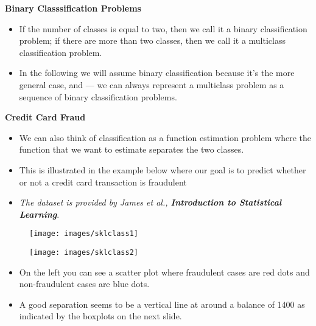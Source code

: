 \documentclass[SKL-MASTER.tex]{subfiles}
\begin{document}
\newpage
 	\LARGE
 	\textbf{Binary Classsification Problems}\\
 	\begin{itemize}
\item If the number of classes is equal to two, then we call it a binary classification problem; if there are more than two classes, then we call it a multiclass classification problem.
\item  In the following we will assume binary classification because it’s the more general case, and — we can always represent a multiclass problem as a sequence of binary classification problems.
\end{itemize}

\newpage
\textbf{Credit Card Fraud}
\begin{itemize}
\item We can also think of classification as a function estimation problem where the function that we want to estimate separates the two classes. 
\item This is illustrated in the example below where our goal is to predict whether or not a credit card transaction is fraudulent
\item \textit{The dataset is provided by James et al., \textbf{Introduction to Statistical Learning}}.
\end{itemize}


\begin{figure}[h!]
\centering
\texttt{[image: images/sklclass1]}

\end{figure}


\begin{figure}[h!]
\centering
\texttt{[image: images/sklclass2]}

\end{figure}


	\begin{itemize}
\item 	On the left you can see a scatter plot where fraudulent cases are red dots and non-fraudulent cases are blue dots. 
\item A good separation seems to be a vertical line at around a balance of 1400 as indicated by the boxplots on the next slide.
	\end{itemize}
	
\end{document}
